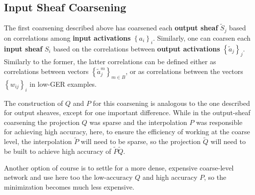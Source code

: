 \documentclass{article} %
\begin{document}
\subsection{Input Sheaf Coarsening}
The first coarsening described above has coarsened each \textbf{output sheaf} $\tilde{S}_j$ based on correlations among \textbf{input activations} $\left\{a_i\right\}_i$. Similarly, one can coarsen each \textbf{input sheaf} $S_i$ based on the correlations between \textbf{output activations} $\left\{\tilde{a}_j \right\}_j$. Similarly to the former, the latter correlations can be defined either as correlations between vectors $\left\{\tilde{a}^m_j\right\}_{m \in B}$, or as correlations between the vectors $\left\{w_{ij}\right\}_i$ in low-GER examples.

The construction of $Q$ and $P$ for this coarsening is analogous to the one described for output sheaves, except for one important difference. While in the output-sheaf coarsening the projection $Q$ was sparse and the interpolation $P$ was responsible for achieving high accuracy, here, to ensure the efficiency of working at the coarse level, the interpolation $\tilde{P}$ will need to be sparse, so the projection $\tilde{Q}$ will need to be built to achieve high accuracy of $\tilde{P} \tilde{Q}$.

Another option of course is to settle for a more dense, expensive coarse-level network and use here too the low-accuracy $Q$ and high accuracy $P$, so the minimization becomes much less expensive.
\end{document}
